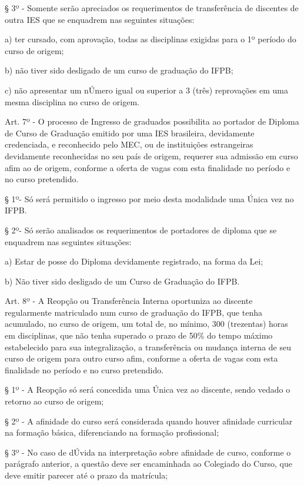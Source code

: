 § 3º - Somente serão apreciados os requerimentos de transferência de discentes de outra IES que se enquadrem nas seguintes situações:

a)	ter cursado, com aprovação, todas as disciplinas exigidas para o 1º período do curso de origem;

b)	não tiver sido desligado de um curso de graduação do IFPB;

c)	não apresentar um nÚmero igual ou superior a 3 (três) reprovações em uma mesma disciplina no curso de origem.

\vspace{1mm}
Art. 7º - O processo de Ingresso de graduados possibilita ao portador de Diploma de Curso de Graduação emitido por uma IES brasileira, devidamente credenciada, e reconhecido pelo MEC, ou de instituições estrangeiras devidamente reconhecidas no seu país de origem, requerer sua admissão em curso afim ao de origem, conforme a oferta de vagas com esta finalidade no período e no curso pretendido.

§ 1º- Só será permitido o ingresso por meio desta modalidade uma Única vez no IFPB.

§ 2º- Só serão analisados os requerimentos de portadores de diploma que se enquadrem nas seguintes situações:

a) Estar de posse do Diploma devidamente registrado, na forma da Lei;

b) Não tiver sido desligado de um Curso de Graduação do IFPB.

\vspace{1mm}
	Art. 8º - A Reopção ou Transferência Interna oportuniza ao discente regularmente matriculado num curso de graduação do IFPB, que tenha acumulado, no curso de origem, um total de, no mínimo, 300 (trezentas) horas em disciplinas, que não tenha superado o prazo de 50\% do tempo máximo estabelecido para sua integralização, a transferência ou mudança interna de seu curso de origem para outro curso afim, conforme a oferta de vagas com esta finalidade no período e no curso pretendido.

	§ 1º - A Reopção só será concedida uma Única vez ao discente, sendo vedado o retorno ao curso de origem;

	§ 2º - A afinidade do curso será considerada quando houver afinidade curricular na formação básica, diferenciando na formação profissional;

	§ 3º - No caso de dÚvida na interpretação sobre afinidade de curso, conforme o parágrafo anterior, a questão deve ser encaminhada ao Colegiado do Curso, que deve emitir parecer até o prazo da matrícula;

